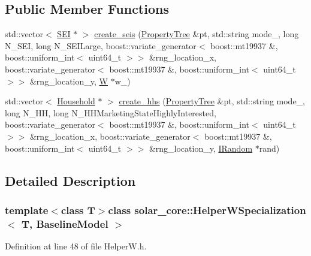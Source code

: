 \subsection*{Public Member Functions}
\begin{DoxyCompactItemize}
\item 
std\+::vector$<$ \hyperlink{classsolar__core_1_1_s_e_i}{S\+E\+I} $\ast$ $>$ \hyperlink{classsolar__core_1_1_helper_w_specialization_3_01_t_00_01_baseline_model_01_4_a9f9f25055cdc6e402ae717b540a1feac}{create\+\_\+seis} (\hyperlink{namespacesolar__core_adeda2737d6938c190eb774a5b2495045}{Property\+Tree} \&pt, std\+::string mode\+\_\+, long N\+\_\+\+S\+E\+I, long N\+\_\+\+S\+E\+I\+Large, boost\+::variate\+\_\+generator$<$ boost\+::mt19937 \&, boost\+::uniform\+\_\+int$<$ uint64\+\_\+t $>$$>$ \&rng\+\_\+location\+\_\+x, boost\+::variate\+\_\+generator$<$ boost\+::mt19937 \&, boost\+::uniform\+\_\+int$<$ uint64\+\_\+t $>$$>$ \&rng\+\_\+location\+\_\+y, \hyperlink{classsolar__core_1_1_w}{W} $\ast$w\+\_\+)
\item 
std\+::vector$<$ \hyperlink{classsolar__core_1_1_household}{Household} $\ast$ $>$ \hyperlink{classsolar__core_1_1_helper_w_specialization_3_01_t_00_01_baseline_model_01_4_aaf9f30218e0bc792ed2817caf89b576d}{create\+\_\+hhs} (\hyperlink{namespacesolar__core_adeda2737d6938c190eb774a5b2495045}{Property\+Tree} \&pt, std\+::string mode\+\_\+, long N\+\_\+\+H\+H, long N\+\_\+\+H\+H\+Marketing\+State\+Highly\+Interested, boost\+::variate\+\_\+generator$<$ boost\+::mt19937 \&, boost\+::uniform\+\_\+int$<$ uint64\+\_\+t $>$$>$ \&rng\+\_\+location\+\_\+x, boost\+::variate\+\_\+generator$<$ boost\+::mt19937 \&, boost\+::uniform\+\_\+int$<$ uint64\+\_\+t $>$$>$ \&rng\+\_\+location\+\_\+y, \hyperlink{classsolar__core_1_1_i_random}{I\+Random} $\ast$rand)
\end{DoxyCompactItemize}


\subsection{Detailed Description}
\subsubsection*{template$<$class T$>$class solar\+\_\+core\+::\+Helper\+W\+Specialization$<$ T, Baseline\+Model $>$}



Definition at line 48 of file Helper\+W.\+h.



